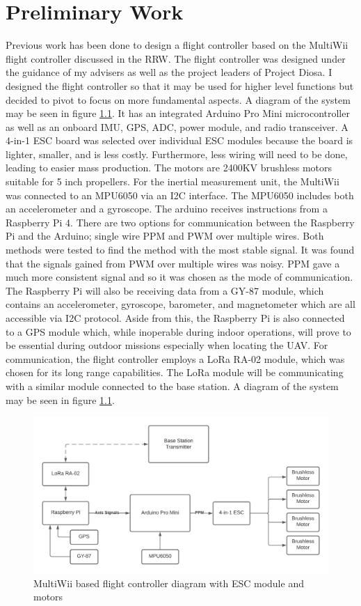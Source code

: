 \documentclass[english]{upeeei}
\begin{document}
\chapter{Preliminary Work}
Previous work has been done to design a flight controller based on the MultiWii flight controller discussed in the RRW. 
The flight controller was designed under the guidance of my advisers as well as the project leaders of Project Diosa.
I designed the flight controller so that it may be used for higher level functions but decided to pivot to focus on more fundamental aspects. 
A diagram of the system may be seen in figure \ref{fig:final_FC_diagram}. It has an integrated
Arduino Pro Mini microcontroller as well as an onboard IMU, GPS, ADC, power module, and radio transceiver. A 4-in-1 ESC board was selected over
individual ESC modules because the board is lighter, smaller, and is less costly. Furthermore, less wiring will need to
be done, leading to easier mass production. The motors are 2400KV brushless motors suitable for 5 inch propellers.
For the inertial measurement unit, the MultiWii was connected to an MPU6050 via an I2C interface. The MPU6050 includes
both an accelerometer and a gyroscope. The arduino receives instructions from a Raspberry Pi 4. There are two
options for communication between the Raspberry Pi and the Arduino; single wire PPM and PWM over multiple wires. Both
methods were tested to find the method with the most stable signal. It was found that the signals gained from PWM over
multiple wires was noisy. PPM gave a much more consistent signal and so it was chosen as the mode of communication.
The Raspberry Pi will also be receiving data from a GY-87 module, which contains an accelerometer, gyroscope, barometer, 
and magnetometer which are all accessible via I2C protocol.  
Aside from this, the Raspberry Pi is also connected to a GPS module which, while inoperable during indoor operations,
will prove to be essential during outdoor missions especially when locating the UAV. For communication, the flight controller 
employs a LoRa RA-02 module, which was chosen for its long range capabilities. The LoRa module will be communicating with a 
similar module connected to the base station. A diagram of the system may be seen in figure \ref{fig:final_FC_diagram}. 
\begin{figure}[h]
    \centering
    \includegraphics[scale=0.5]{images/final_FC diagram.png}
    \caption{MultiWii based flight controller diagram with ESC module and motors}
    \label{fig:final_FC_diagram}
\end{figure}
\end{document}
